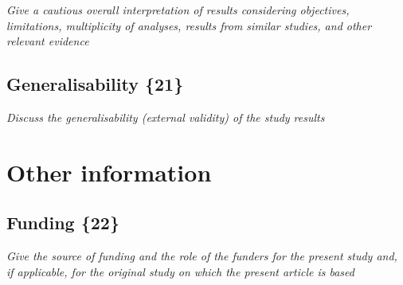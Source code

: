 {\em Give a cautious overall interpretation of results considering
objectives, limitations, multiplicity of analyses, results from
similar studies, and other relevant evidence}

\subsection{Generalisability \{21\}}

{\em Discuss the generalisability (external validity) of the study results}

\section{Other information}

\subsection{Funding \{22\}}

{\em Give the source of funding and the role of the funders for the present
study and, if applicable, for the original study on which the present
article is based}


